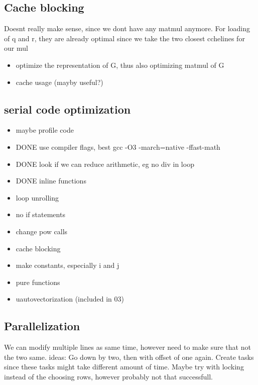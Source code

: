 \documentclass[a4paper]{scrartcl}
\begin{document}
        \subsection{Cache blocking}
            Doesnt really make sense, since we dont have any matmul anymore. 
            For loading of q and r, they are already optimal since we take the two closest cchelines for our mul






            \begin{itemize}
                \item optimize the representation of G, thus also optimizing matmul of G
                \item cache usage (mayby useful?)
            \end{itemize}

        \subsection{serial code optimization}
            \begin{itemize}
                \item maybe profile code
                \item DONE use compiler flags, best gcc -O3 -march=native -ffast-math
                \item DONE look if we can reduce arithmetic, eg no div in loop
                \item DONE inline functions
                \item loop unrolling
                \item no if statements
                \item change pow calls
                \item cache blocking
                \item make constants, especially i and j
                \item pure functions
                \item uautovectorization (included in 03)
            \end{itemize}


        \subsection{Parallelization}
            We can modify multiple lines as same time, however need to make sure that not the two same. ideas:
            Go down by two, then with offset of one again.
            Create tasks since these tasks might take different amount of time.
            Maybe try with locking instead of the choosing rows, however probably not that successfull.
\end{document}
